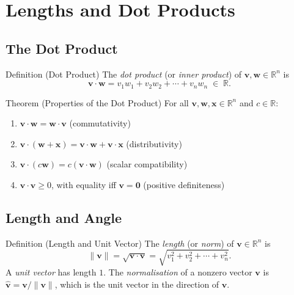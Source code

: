 
\section{Lengths and Dot Products}

\subsection*{The Dot Product}

\begin{propositionbox}{Definition (Dot Product)}
The \emph{dot product} (or \emph{inner product}) of $\mathbf{v}, \mathbf{w} \in \mathbb{R}^n$ is
\[
  \mathbf{v} \cdot \mathbf{w} = v_1 w_1 + v_2 w_2 + \cdots + v_n w_n \;\in\; \mathbb{R}.
\]
\end{propositionbox}

\begin{theorembox}{Theorem (Properties of the Dot Product)}
For all $\mathbf{v}, \mathbf{w}, \mathbf{x} \in \mathbb{R}^n$ and $c \in \mathbb{R}$:
\begin{enumerate}
  \item $\mathbf{v} \cdot \mathbf{w} = \mathbf{w} \cdot \mathbf{v}$ \hfill (commutativity)
  \item $\mathbf{v} \cdot (\mathbf{w} + \mathbf{x}) = \mathbf{v} \cdot \mathbf{w} + \mathbf{v} \cdot \mathbf{x}$ \hfill (distributivity)
  \item $\mathbf{v} \cdot (c\mathbf{w}) = c(\mathbf{v} \cdot \mathbf{w})$ \hfill (scalar compatibility)
  \item $\mathbf{v} \cdot \mathbf{v} \geq 0$, with equality iff $\mathbf{v} = \mathbf{0}$ \hfill (positive definiteness)
\end{enumerate}
\end{theorembox}

\subsection*{Length and Angle}

\begin{propositionbox}{Definition (Length and Unit Vector)}
The \emph{length} (or \emph{norm}) of $\mathbf{v} \in \mathbb{R}^n$ is
\[
  \|\mathbf{v}\| = \sqrt{\mathbf{v} \cdot \mathbf{v}} = \sqrt{v_1^2 + v_2^2 + \cdots + v_n^2}.
\]
A \emph{unit vector} has length $1$.
The \emph{normalisation} of a nonzero vector $\mathbf{v}$ is
$\hat{\mathbf{v}} = \mathbf{v}/\|\mathbf{v}\|$, which is the unit vector in the direction of $\mathbf{v}$.
\end{propositionbox}

